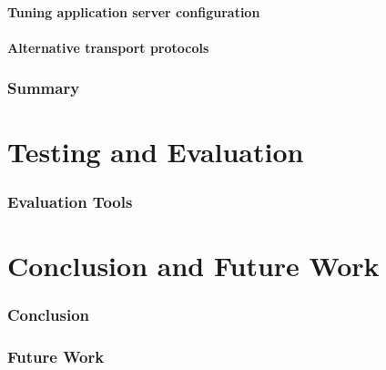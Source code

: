\documentclass[USenglish]{article}
\begin{document}
\subsection{Tuning application server configuration}

\subsection{Alternative transport protocols}

\section{Summary}

\part{Testing and Evaluation}
\section{Evaluation Tools}

\part{Conclusion and Future Work}
\section{Conclusion}

\section{Future Work}

\pagebreak
\printbibliography{}
\printglossary
\end{document}
